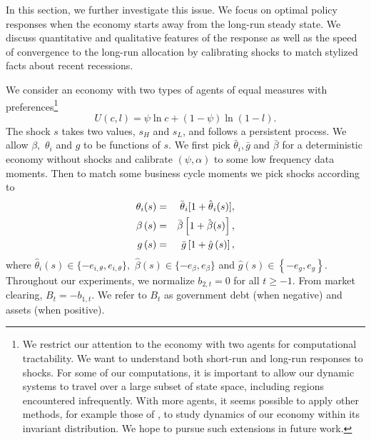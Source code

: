 \documentclass[thmsb,11pt]{article}
\begin{document}
In this section, we further investigate this issue.
We focus on  optimal policy responses when the economy starts away
from the long-run steady state. We discuss  quantitative and qualitative
features of the response as well as the speed of convergence to the long-run
allocation by calibrating  shocks to match stylized facts about recent
recessions.

\smallskip We consider an economy with two types of agents%
of equal measures with preferences\footnote{%
We restrict our attention to the economy with two agents for computational
tractability. We want to understand both short-run and long-run
responses to shocks.  For some of our computations,  it is important to allow our
dynamic systems to travel over a large subset of state space, including regions encountered infrequently.
With more agents, it seems  possible to apply other methods,  for example those of  \cite{Judd2011}, to study dynamics of our economy within its invariant
distribution. We hope to pursue such extensions in  future work.}
\begin{equation*}
U\left( c,l\right) =\psi \ln c+\left( 1-\psi \right) \ln \left( 1-l\right) .
\end{equation*}%
The shock $s$   takes two values, $s_{H}$ and $s_{L}$, and follows a persistent
process. We allow $\beta ,$ $\theta _{i}$ and $g$ to be
functions of $s.$ We first pick $\bar{\theta}_{i},\bar{g}$
and $\bar{\beta}$ for a deterministic economy without shocks and calibrate $%
\left( \psi ,\alpha \right) $ to some low frequency  data moments. Then to match some business cycle moments we
pick shocks  according to
\begin{eqnarray}\label{eqn:newstar}
\theta _{i}(s) &=&\bar{\theta}_{i}[1+{\hat{\theta}}_{i}(s)], \cr
\beta \left( s\right) &=&\bar{\beta}\left[ 1+\hat{\beta}(s)\right] , \cr
g\left( s\right) &=&\bar{g}\left[ 1+\hat{g}\left( s\right) \right] ,
\end{eqnarray}%
where $\hat{\theta}_{i}\left( s\right) \in \{-e_{i,\theta },e_{i,\theta }\},$
$\hat{\beta}\left( s\right) \in \{-e_{\beta },e_{\beta }\}$ and $\hat{g}%
\left( s\right) \in \left\{ -e_{g},e_{g}\right\} .$ Throughout  our
experiments, we normalize $b_{2,t}=0$ for all $t\geq -1$. From market
clearing,  $B_{t}=-b_{1,t}$.  We refer to $B_{t}$ as
government debt (when negative) and  assets (when positive).
\end{document}
